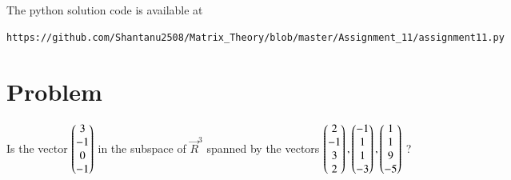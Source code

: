 \documentclass[journal,12pt,twocolumn]{IEEEtran}
\begin{document}
The python solution code is available at
\begin{lstlisting}
https://github.com/Shantanu2508/Matrix_Theory/blob/master/Assignment_11/assignment11.py
\end{lstlisting}

\section{Problem}
Is the vector $\begin{pmatrix}3\\-1\\0\\-1\end{pmatrix}$ in the subspace of $\vec{R}^3$ spanned by the vectors
$\begin{pmatrix}2\\-1\\3\\2\end{pmatrix},\begin{pmatrix}-1\\1\\1\\-3\end{pmatrix},\begin{pmatrix}1\\1\\9\\-5\end{pmatrix}$ ?
\end{document}

